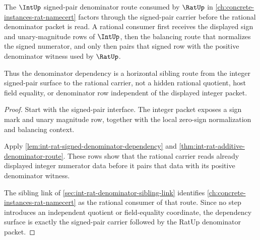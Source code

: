 \begin{theorem}
\label{thm:int-rat-denominator-dependency-surface}
The $\IntUp$ signed-pair denominator route consumed by $\RatUp$ in \autoref{ch:concrete-instances-rat-namecert} factors through the signed-pair carrier before the rational denominator packet is read. A rational consumer first receives the displayed sign and unary-magnitude rows of $\IntUp$, then the balancing route that normalizes the signed numerator, and only then pairs that signed row with the positive denominator witness used by $\RatUp$.

Thus the denominator dependency is a horizontal sibling route from the integer signed-pair surface to the rational carrier, not a hidden rational quotient, host field equality, or denominator row independent of the displayed integer packet.
\end{theorem}
\begin{proof}
Start with the signed-pair interface. The integer packet exposes a sign mark and unary magnitude row, together with the local zero-sign normalization and balancing context.

Apply \autoref{lem:int-rat-signed-denominator-dependency} and \autoref{thm:int-rat-additive-denominator-route}. These rows show that the rational carrier reads already displayed integer numerator data before it pairs that data with its positive denominator witness.

The sibling link of \autoref{sec:int-rat-denominator-sibling-link} identifies \autoref{ch:concrete-instances-rat-namecert} as the rational consumer of that route. Since no step introduces an independent quotient or field-equality coordinate, the dependency surface is exactly the signed-pair carrier followed by the RatUp denominator packet.
\end{proof}
